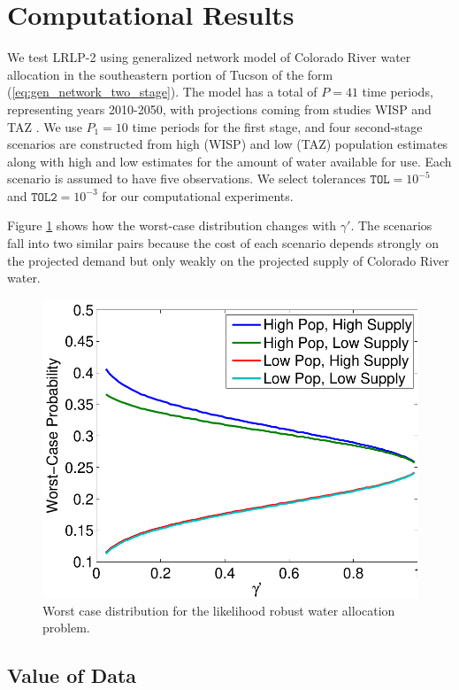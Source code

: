 \documentclass[11pt]{article}
\begin{document}
\section{Computational Results} \label{sec:comp_results}

We test LRLP-2 using generalized network model of Colorado River water allocation in the southeastern portion of Tucson of the form (\ref{eq:gen_network_two_stage}).  The model has a total of $P = 41$ time periods, representing years 2010-2050, with projections coming from studies WISP \cite{??} and TAZ \cite{??}.  We use $P_1 = 10$ time periods for the first stage, and four second-stage scenarios are constructed from high (WISP) and low (TAZ) population estimates along with high and low estimates for the amount of water available for use.  Each scenario is assumed to have five observations.  We select tolerances $\texttt{TOL} = 10^{-5}$ and $\texttt{TOL2} = 10^{-3}$ for our computational experiments.

Figure \ref{fig:worst_case} shows how the worst-case distribution changes with $\gamma'$.  The scenarios fall into two similar pairs because the cost of each scenario depends strongly on the projected demand but only weakly on the projected supply of Colorado River water.

\begin{figure}
	\centering
	\includegraphics[width=.5\textwidth]{images/worst_case_probability}
	\caption{Worst case distribution for the likelihood robust water allocation problem.}
	\label{fig:worst_case}
\end{figure}



\subsection{Value of Data}
\end{document}
